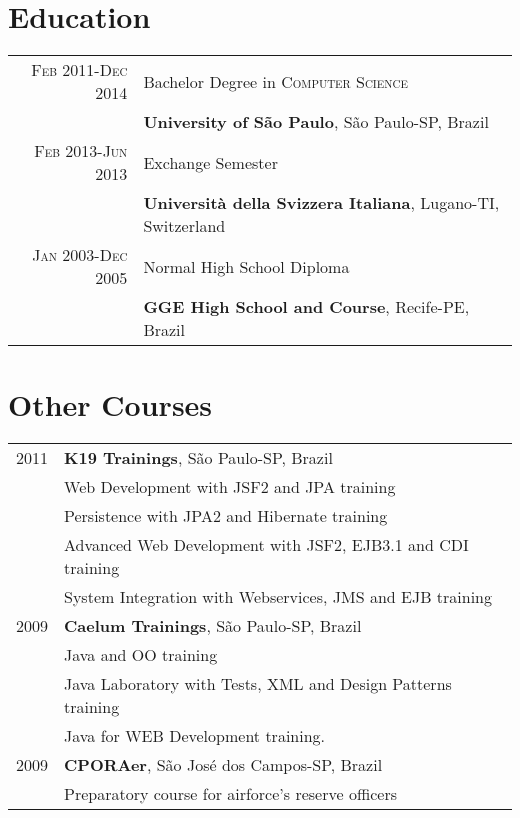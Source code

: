 \documentclass[a4paper,10pt]{article} %
\begin{document}

\section{Education}

\begin{tabular}{r|p{11cm}}
\textsc{Feb} 2011-\textsc{Dec} 2014& Bachelor Degree in \textsc{}\textsc{Computer Science} \\& \normalsize\textbf{University of São Paulo}, São Paulo-SP, Brazil
\multicolumn{2}{c}{}\\


\textsc{Feb} 2013-\textsc{Jun} 2013& Exchange Semester\\
    & \textbf{Università della Svizzera Italiana}, Lugano-TI, Switzerland
\multicolumn{2}{c}{}\\
    

\textsc{Jan} 2003-\textsc{Dec} 2005& Normal High School Diploma\\
  & \textbf{GGE High School and Course}, Recife-PE, Brazil
\end{tabular}

\section{Other Courses}

\begin{tabular}{r|p{11cm}}
2011 & \textbf{K19 Trainings}, S\~ao Paulo-SP, Brazil\\
    & \footnotesize{Web Development with JSF2 and JPA} training\\
    & \footnotesize{Persistence with JPA2 and Hibernate} training\\
    & \footnotesize{Advanced Web Development with JSF2, EJB3.1 and CDI} training\\
    & \footnotesize{System Integration with Webservices, JMS and EJB} training
    \multicolumn{2}{c}{}\\
    
2009 & \textbf{Caelum Trainings}, S\~{a}o Paulo-SP, Brazil\\
    & \footnotesize{Java and OO} training\\
    & \footnotesize{Java Laboratory with Tests, XML and Design Patterns} training\\
    & \footnotesize{Java for WEB Development} training.
    \multicolumn{2}{c}{}\\

2009 & \textbf{CPORAer}, São José dos Campos-SP, Brazil\\
    & \footnotesize{Preparatory course for airforce's reserve officers}

\end{tabular}
\end{document}
